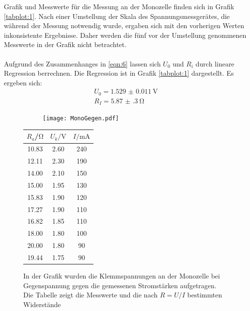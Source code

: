 Grafik und Messwerte für die Messung an der Monozelle finden sich in Grafik \ref{tabplot:1}. Nach einer
Umstellung der Skala des Spannungsmessgerätes, die während der Messung notwendig wurde, ergaben sich
mit den vorherigen Werten inkonsistente Ergebnisse. Daher werden die fünf vor der Umstellung genommenen Messwerte
in der Grafik nicht betrachtet.\\
\\
Aufgrund des Zusammenhanges in \eqref{eqn:6} lassen sich $U_0$ und $R_i$ durch lineare Regression berrechnen.
Die Regression ist in Grafik \ref{tabplot:1} dargestellt. Es ergeben sich:
\begin{equation*}
  \begin{split}
    U_0 = \SI{1.529(11)}{\volt}\\
    R_I = \SI{5.87(30)}{\ohm}
  \end{split}
\end{equation*}
\newpage
\begin{figure}[h]
  \begin{subfigure}{0.74\textwidth}
  \centering
    \texttt{[image: MonoGegen.pdf]}
    \label{sub:3}
    \qquad
  \end{subfigure}
  \begin{subtable}{0.25\textwidth}
  \centering
    \begin{tabular}{c c c}
    \toprule
    $R_a$/$\si{\ohm}$ & $U_{k}/\si{\volt}$ & $I/\si{\milli\ampere}$ \\
    \midrule
    10.83 & 2.60 & 240 \\
    12.11 & 2.30 & 190 \\
    14.00 & 2.10 & 150 \\
    15.00 & 1.95 & 130 \\
    15.83 & 1.90 & 120 \\
    17.27 & 1.90 & 110 \\
    16.82 & 1.85 & 110 \\
    18.00 & 1.80 & 100 \\
    20.00 & 1.80 & 90 \\
    19.44 & 1.75 & 90 \\
    \bottomrule
    \end{tabular}
    \label{sub:4}
    \qquad
  \end{subtable}
  \caption{In der Grafik wurden die Klemmspannungen an der Monozelle bei Gegenspannung
  gegen die gemessenen Stromstärken aufgetragen. Die Tabelle zeigt die Messwerte und die
   nach $R = U/I$ bestimmten Widerstände}
  \label{tabplot:2}
\end{figure}

